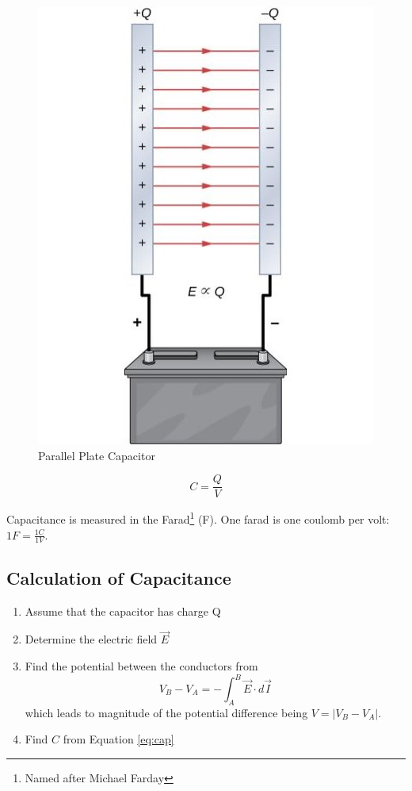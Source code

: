 \documentclass[14pt]{memoir}
\begin{document}
\begin{figure}[H]
\begin{center}
\includegraphics[scale=0.50]{fig/fig_08_03.jpg}
\caption{Parallel Plate Capacitor}
\label{fig:08_03}
\end{center}
\end{figure}



\begin{equation}
C = \frac{Q}{V}
\label{eq:cap}
\end{equation}

Capacitance is measured in the Farad\footnote{Named after Michael Farday} (F). One farad is one coulomb per volt: $1 F = \frac{1 C}{1 V}$. 

\subsection{Calculation of Capacitance}
\begin{enumerate}
\item Assume that the capacitor has charge Q
\item Determine the electric field $\vec{E}$
\item Find the potential between the conductors from
	\begin{equation}
	V_B - V_A = - \int_A^B \vec{E} \cdot d\vec{I}
	\label{eq:potcon}
	\end{equation}
	which leads to magnitude of the potential difference being $V = \left| V_B - V_A \right|$.
\item Find $C$ from Equation \ref{eq:cap}
\end{enumerate}
\end{document}
